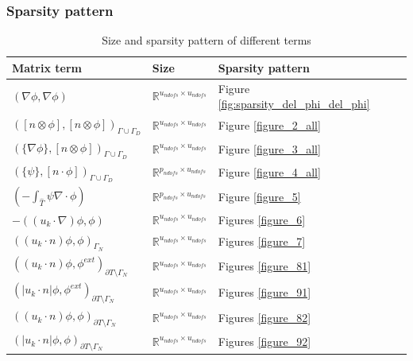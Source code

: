 \documentclass{beamer}
\begin{document}

\begin{frame}
\frametitle{Sparsity pattern}

\begin{table}[H]
\caption{Size and sparsity pattern of different terms}
\begin{center}
\begin{tabular}{|p{}| p{} |  p{}|}
\hline
\textbf{Matrix term} & \textbf{Size} & \textbf{Sparsity pattern} \\
\hline
$(\nabla \phi, \nabla \phi)$ & $\mathbb{R}^{u_{ndofs} \times u_{ndofs}}$ & Figure \ref{fig:sparsity_del_phi_del_phi}\\
\hline
$([n \otimes \phi],[n \otimes \phi])_{\Gamma \cup \Gamma_D}$ & $\mathbb{R}^{u_{ndofs} \times u_{ndofs}}$ & Figure \ref{figure_2_all}\\
\hline
$(\lbrace \nabla \phi \rbrace,[n \otimes \phi])_{\Gamma \cup \Gamma_D}$ & $\mathbb{R}^{u_{ndofs} \times u_{ndofs}}$ & Figure \ref{figure_3_all}\\
\hline
$(\lbrace \psi \rbrace,[n \cdot \phi])_{\Gamma \cup \Gamma_D}$ & $\mathbb{R}^{p_{ndofs} \times u_{ndofs}}$ & Figure \ref{figure_4_all}\\
\hline
$(- \int_{\hat{T}} \psi \nabla \cdot \phi)$ & $\mathbb{R}^{p_{ndofs} \times u_{ndofs}}$ & Figure \ref{figure_5} \\
\hline
$-((u_k \cdot \nabla)\phi , \phi)$ & $\mathbb{R}^{u_{ndofs} \times u_{ndofs}}$ & Figures \ref{figure_6}\\
\hline
$((u_k \cdot n)\phi , \phi)_{\Gamma_N}$ & $\mathbb{R}^{u_{ndofs} \times u_{ndofs}}$ & Figures \ref{figure_7}\\
\hline
$((u_k \cdot n)\phi,\phi^{ext})_{\partial T \setminus \Gamma_N}$ & $\mathbb{R}^{u_{ndofs} \times u_{ndofs}}$ & Figures \ref{figure_81}\\
\hline
$(|u_k \cdot n|\phi,\phi^{ext})_{\partial T \setminus \Gamma_N}$ & $\mathbb{R}^{u_{ndofs} \times u_{ndofs}}$ & Figures \ref{figure_91}\\
\hline
$((u_k \cdot n)\phi,\phi)_{\partial T \setminus \Gamma_N}$ & $\mathbb{R}^{u_{ndofs} \times u_{ndofs}}$ & Figures \ref{figure_82}\\
\hline
$(|u_k \cdot n|\phi,\phi)_{\partial T \setminus \Gamma_N}$ & $\mathbb{R}^{u_{ndofs} \times u_{ndofs}}$ & Figures \ref{figure_92}\\
\hline
\end{tabular}
\end{center}
\end{table}

\end{frame}
\end{document}
